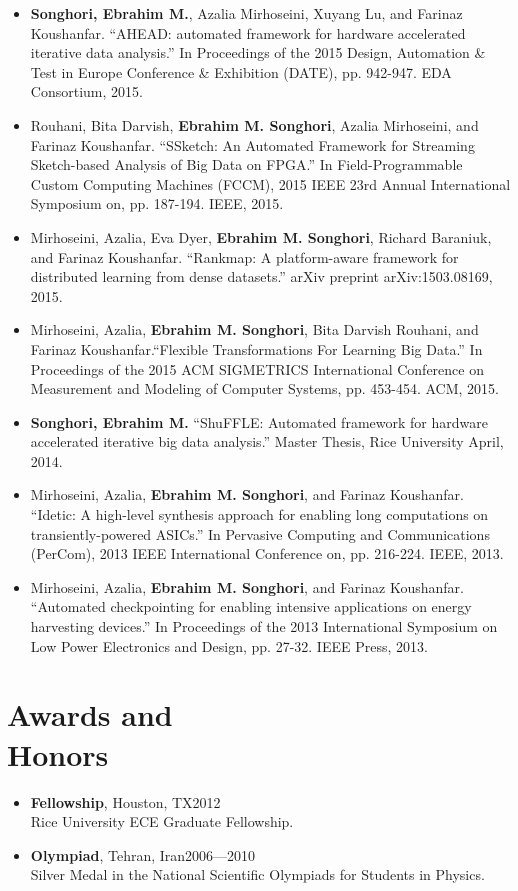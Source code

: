 \documentclass[overlapped]{res}
\begin{document}
\begin{resume}
\begin{itemize}
\item {\bf Songhori, Ebrahim M.}, Azalia Mirhoseini, Xuyang Lu, and Farinaz Koushanfar. ``AHEAD: automated framework for hardware accelerated iterative data analysis.'' In Proceedings of the 2015 Design, Automation \& Test in Europe Conference \& Exhibition (DATE), pp. 942-947. EDA Consortium, 2015.
\item Rouhani, Bita Darvish, {\bf Ebrahim M. Songhori}, Azalia Mirhoseini, and Farinaz Koushanfar. ``SSketch: An Automated Framework for Streaming Sketch-based Analysis of Big Data on FPGA.'' In Field-Programmable Custom Computing Machines (FCCM), 2015 IEEE 23rd Annual International Symposium on, pp. 187-194. IEEE, 2015.
\item Mirhoseini, Azalia, Eva Dyer, {\bf Ebrahim M. Songhori}, Richard Baraniuk, and Farinaz Koushanfar. ``Rankmap: A platform-aware framework for distributed learning from dense datasets.'' arXiv preprint arXiv:1503.08169, 2015.
\item Mirhoseini, Azalia, {\bf Ebrahim M. Songhori}, Bita Darvish Rouhani, and Farinaz Koushanfar.``Flexible Transformations For Learning Big Data.'' In Proceedings of the 2015 ACM SIGMETRICS International Conference on Measurement and Modeling of Computer Systems, pp. 453-454. ACM, 2015.
\item {\bf Songhori, Ebrahim M.} ``ShuFFLE: Automated framework for hardware accelerated iterative big data analysis.'' Master Thesis, Rice University April, 2014.
\item Mirhoseini, Azalia, {\bf Ebrahim M. Songhori}, and Farinaz Koushanfar. ``Idetic: A high-level synthesis approach for enabling long computations on transiently-powered ASICs.'' In Pervasive Computing and Communications (PerCom), 2013 IEEE International Conference on, pp. 216-224. IEEE, 2013.
\item Mirhoseini, Azalia, {\bf Ebrahim M. Songhori}, and Farinaz Koushanfar. ``Automated checkpointing for enabling intensive applications on energy harvesting devices.'' In Proceedings of the 2013 International Symposium on Low Power Electronics and Design, pp. 27-32. IEEE Press, 2013.
\end{itemize}

\section{Awards and\\ Honors}
\begin{itemize}
\item {\bf Fellowship}, Houston, TX\hfill 2012\\
Rice University ECE Graduate Fellowship.
\item {\bf Olympiad}, Tehran, Iran\hfill\hfill 2006---2010\\
Silver Medal in the National Scientific Olympiads for Students in Physics.\\
\end{itemize}


\end{resume}
\end{document}
